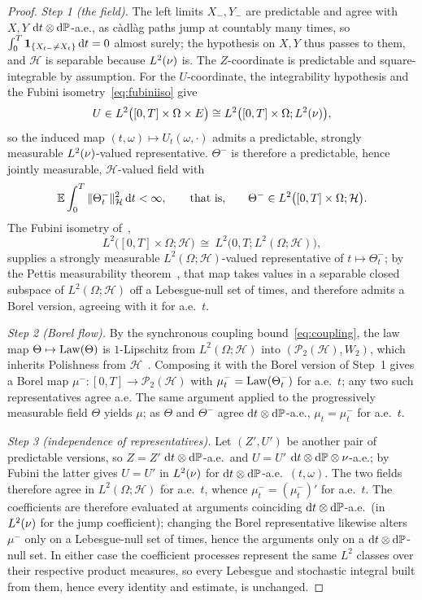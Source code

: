 \begin{proof}
\emph{Step 1 (the field).} The left limits $X_-,Y_-$ are predictable and agree with $X,Y$
$\mathrm{d} t\otimes\mathrm{d}\mathbb{P}$-a.e., as c\`adl\`ag paths jump at countably many times, so
$\int_0^T\mathbf 1_{\{X_{t-}\neq X_t\}}\,\mathrm{d} t=0$ almost surely; the hypothesis on
$X,Y$ thus passes to them, and $\mathcal H$ is separable because $L^2(\nu)$ is. The
$Z$-coordinate is predictable and square-integrable by assumption. For the
$U$-coordinate, the integrability hypothesis and the Fubini
isometry~\eqref{eq:fubiniiso} give
\[
U\in L^2\bigl([0,T]\times\Omega\times E\bigr)\cong L^2\bigl([0,T]\times\Omega;L^2(\nu)\bigr),
\]
so the induced map $(t,\omega)\mapsto U_t(\omega,\cdot)$ admits a predictable, strongly
measurable $L^2(\nu)$-valued representative. $\Theta^-$ is therefore a
predictable, hence jointly measurable, $\mathcal H$-valued field with
\[
\mathbb{E}\int_0^T\|\Theta_t^-\|_{\mathcal H}^2\,\mathrm{d} t<\infty,
\qquad\text{that is,}\qquad
\Theta^-\in L^2\bigl([0,T]\times\Omega;\mathcal H\bigr).
\]
The Fubini isometry of~\cite[Proposition~1.2.24]{HNVW},
\[
L^2\bigl([0,T]\times\Omega;\mathcal H\bigr)\ \cong\ L^2\bigl(0,T;L^2(\Omega;\mathcal H)\bigr),
\]
supplies a strongly measurable
$L^2(\Omega;\mathcal H)$-valued representative of $t\mapsto\Theta_t^-$; by the Pettis
measurability theorem~\cite[Theorem~1.1.6]{HNVW}, that map takes values in a separable
closed subspace of $L^2(\Omega;\mathcal H)$ off a Lebesgue-null set of times, and
therefore admits a Borel version, agreeing with it for a.e.\ $t$.

\emph{Step 2 (Borel flow).} By the synchronous coupling bound~\eqref{eq:coupling}, the
law map $\Theta\mapsto\mathrm{Law}(\Theta)$ is $1$-Lipschitz from $L^2(\Omega;\mathcal H)$ into
$(\mathcal P_2(\mathcal H),W_2)$, which inherits Polishness from
$\mathcal H$~\cite[Ch.~6]{Villani2009}. Composing it with the Borel version of Step~1 gives a
Borel map $\mu^-:[0,T]\to\mathcal P_2(\mathcal H)$ with $\mu_t^-=\mathrm{Law}(\Theta_t^-)$
for a.e.\ $t$; any two such representatives agree a.e. The same argument applied to
the progressively measurable field $\Theta$ yields $\mu$; as $\Theta$ and $\Theta^-$
agree $\mathrm{d} t\otimes\mathrm{d}\mathbb{P}$-a.e., $\mu_t=\mu_t^-$ for a.e.\ $t$.

\emph{Step 3 (independence of representatives).} Let $(Z',U')$ be another pair of
predictable versions, so $Z=Z'$ $\mathrm{d} t\otimes\mathrm{d}\mathbb{P}$-a.e.\ and $U=U'$
$\mathrm{d} t\otimes\mathrm{d}\mathbb{P}\otimes\nu$-a.e.; by Fubini the latter gives $U=U'$ in $L^2(\nu)$
for $\mathrm{d} t\otimes\mathrm{d}\mathbb{P}$-a.e.\ $(t,\omega)$. The two fields therefore agree in
$L^2(\Omega;\mathcal H)$ for a.e.\ $t$, whence $\mu_t^-=(\mu_t^-)'$ for a.e.\ $t$. The
coefficients are therefore evaluated at arguments coinciding
$\mathrm{d} t\otimes\mathrm{d}\mathbb{P}$-a.e.\ (in $L^2(\nu)$ for the jump coefficient); changing the
Borel representative likewise alters $\mu^-$ only on a Lebesgue-null set of times, hence
the arguments only on a $\mathrm{d} t\otimes\mathrm{d}\mathbb{P}$-null set. In either case the
coefficient processes represent the same $L^2$ classes over their respective product
measures, so every Lebesgue and stochastic integral built from them, hence every
identity and estimate, is unchanged.
\end{proof}

